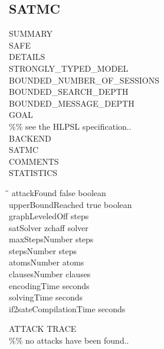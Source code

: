 \subsection{SATMC}
SUMMARY\\
SAFE\\
\linebreak
DETAILS\\
STRONGLY\_TYPED\_MODEL\\
BOUNDED\_NUMBER\_OF\_SESSIONS\\
BOUNDED\_SEARCH\_DEPTH\\
BOUNDED\_MESSAGE\_DEPTH\\
\linebreak
GOAL\\
\%\% see the HLPSL specification..\\
\linebreak
BACKEND\\
SATMC\\
\linebreak
COMMENTS\\
\linebreak
STATISTICS
\begin{nstabbing}
	\hspace{15em}\=\hspace{10em}\=\kill
	attackFound \> false \> boolean\\ 
	upperBoundReached \> true \> boolean \\ 
	graphLeveledOff  \> steps \\ 
	satSolver \> zchaff \> solver \\ 
	maxStepsNumber  \> steps\\ 
	stepsNumber  \> steps \\ 
	atomsNumber  \> atoms \\ 
	clausesNumber  \> clauses\\ 
	encodingTime  \> seconds \\ 
	solvingTime  \> seconds\\ 
	if2sateCompilationTime  \> seconds\\
\end{nstabbing} 

ATTACK TRACE\\
\%\% no attacks have been found..